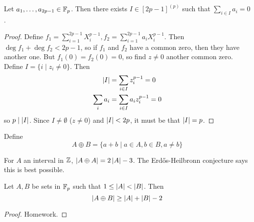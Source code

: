 \documentclass{article}
\begin{document}
\begin{nthm}
  Let $a_1, \dots, a_{2p - 1} \in \mathbb F_p$. Then there exists $I \in [2p - 1]^{(p)}$ such that $\sum_{i \in I} a_i = 0$.
\end{nthm}
\begin{proof}
  Define $f_1 = \sum_{i = 1}^{2p - 1} X_i^{p - 1}, f_2 = \sum_{i = 1}^{2p - 1} a_iX_i^{p - 1}$. Then $\deg f_1 + \deg f_2 < 2p - 1$, so if $f_1$ and $f_2$ have a common zero, then they have another one. But $f_1(0) = f_2(0) = 0$, so find $z \ne 0$ another common zero. Define $I = \{i \mid z_i \ne 0\}$. Then
  \begin{align*}
    \left\lvert I\right\rvert & = \sum_{i \in I} z_i^{p - 1} = 0 \\
    \sum_i a_i & = \sum_{i \in I} a_i z_i^{p - 1} = 0
  \end{align*}
  so $p \mid \left\lvert I\right\rvert$. Since $I \ne \emptyset$ ($z \ne 0$) and $\left\lvert I\right\rvert < 2p$, it must be that $\left\lvert I\right\rvert = p$.
\end{proof}

Define
$$A \oplus B = \{a + b \mid a \in A, b \in B, a \ne b\}$$

For $A$ an interval in $\mathbb Z$, $\left\lvert A \oplus A\right\rvert = 2\left\lvert A\right\rvert - 3$. The Erd\H os-Heilbronn conjecture says this is best possible.

\begin{nthm}
  Let $A, B$ be sets in $\mathbb F_p$ such that $1 \le \left\lvert A\right\rvert < \left\lvert B\right\rvert$. Then
  $$\left\lvert A \oplus B\right\rvert \ge \left\lvert A\right\rvert + \left\lvert B\right\rvert - 2$$
\end{nthm}
\begin{proof}
  Homework.
\end{proof}

\newlec

\printindex
\end{document}
